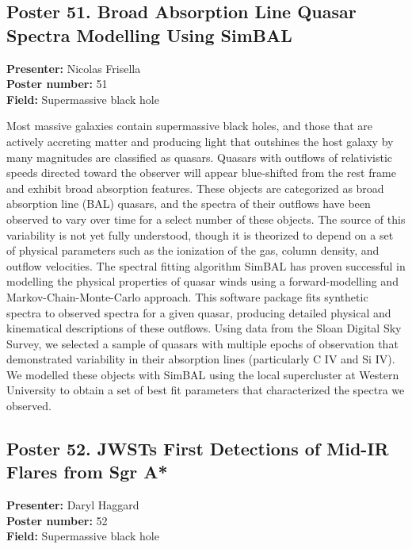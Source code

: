 \hypertarget{poster-abstract-talk-185}{}\label{poster-abstract-page-talk-185}
\subsection*{Poster 51. Broad Absorption Line Quasar Spectra Modelling Using SimBAL}
\textbf{Presenter:} Nicolas Frisella\\
\textbf{Poster number:} 51\\
\textbf{Field:} Supermassive black hole

Most massive galaxies contain supermassive black holes, and those that are actively accreting matter and producing light that outshines the host galaxy by many magnitudes are classified as quasars. Quasars with outflows of relativistic speeds directed toward the observer will appear blue-shifted from the rest frame and exhibit broad absorption features. These objects are categorized as broad absorption line (BAL) quasars, and the spectra of their outflows have been observed to vary over time for a select number of these objects. The source of this variability is not yet fully understood, though it is theorized to depend on a set of physical parameters such as the ionization of the gas, column density, and outflow velocities. The spectral fitting algorithm SimBAL has proven successful in modelling the physical properties of quasar winds using a forward-modelling and Markov-Chain-Monte-Carlo approach. This software package fits synthetic spectra to observed spectra for a given quasar, producing detailed physical and kinematical descriptions of these outflows. Using data from the Sloan Digital Sky Survey, we selected a sample of quasars with multiple epochs of observation that demonstrated variability in their absorption lines (particularly C IV and Si IV). We modelled these objects with SimBAL using the local supercluster at Western University to obtain a set of best fit parameters that characterized the spectra we observed.

\hypertarget{poster-abstract-talk-120}{}\label{poster-abstract-page-talk-120}
\subsection*{Poster 52. JWSTs First Detections of Mid-IR Flares from Sgr A*}
\textbf{Presenter:} Daryl Haggard\\
\textbf{Poster number:} 52\\
\textbf{Field:} Supermassive black hole

